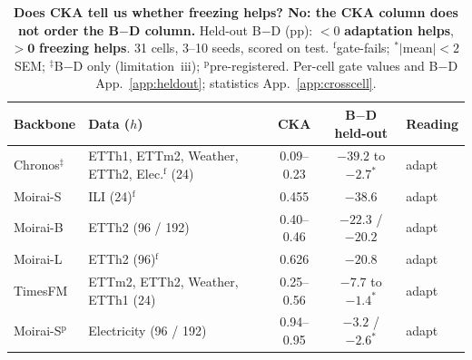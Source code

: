 \documentclass{article}
\begin{document}
\begin{table}[t]
\centering
\caption{\textbf{Does CKA tell us whether freezing helps? No: the CKA column does not order the
B$-$D column.} Held-out B$-$D (pp): ${<}0$ \textbf{adaptation helps}, $\mathbf{>0}$ \textbf{freezing
helps}. 31 cells, 3--10 seeds, scored on test. $^{\text{f}}$gate-fails; $^{*}|$mean$|<2$\,SEM;
$^{\ddagger}$B$-$D only (limitation~iii); $^{\text{p}}$pre-registered. Per-cell gate values and
B$-$D App.~\ref{app:heldout}; statistics App.~\ref{app:crosscell}.}
\label{tab:regimes}
\footnotesize
\setlength{\tabcolsep}{3pt}
\renewcommand{\arraystretch}{1.0}
\begin{tabular}{@{}llccl@{}}
\toprule
Backbone & Data ($h$) & CKA & B$-$D held-out & Reading \\
\midrule
Chronos$^{\ddagger}$  & ETTh1, ETTm2, Weather, ETTh2, Elec.$^{\text{f}}$ (24) & 0.09--0.23 & $-39.2$ to $-2.7^{*}$ & adapt \\
Moirai-S & ILI (24)$^{\text{f}}$ & 0.455 & $-38.6$ & adapt \\
Moirai-B & ETTh2 (96 / 192) & 0.40--0.46 & $-22.3$ / $-20.2$ & adapt \\
Moirai-L & ETTh2 (96)$^{\text{f}}$ & 0.626 & $-20.8$ & adapt \\
TimesFM  & ETTm2, ETTh2, Weather, ETTh1 (24) & 0.25--0.56 & $-7.7$ to $-1.4^{*}$ & adapt \\
Moirai-S$^{\text{p}}$ & Electricity (96 / 192) & 0.94--0.95 & $-3.2$ / $-2.6^{*}$ & adapt \\

\end{tabular}
\end{table}
\end{document}
